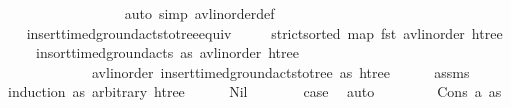 \begin{isabellebody}
\ \ \ \ \ \ \ \ \ \ \ \ \ \ \ \ \isamarkupfalse%
\ {\isacharparenleft}{\kern0pt}auto\ simp{\isacharcolon}{\kern0pt}\ avl{\isacharunderscore}{\kern0pt}inorder{\isacharunderscore}{\kern0pt}def{\isacharparenright}{\kern0pt}\isanewline
\ \ \ \ \ \ \ \ \ \ \ \ \isamarkupfalse%
\isanewline
\ \ \ \ \ \ \ \ \ \ \isamarkupfalse%
\isanewline
\ \ \ \ \ \isamarkupfalse%
\isanewline
\ \ \isamarkupfalse%
%
\endisatagproof
{\isafoldproof}%
%
\isadelimproof
\isanewline
%
\endisadelimproof
\isanewline
\ \ \isamarkupfalse%
\ insert{\isacharunderscore}{\kern0pt}timed{\isacharunderscore}{\kern0pt}ground{\isacharunderscore}{\kern0pt}acts{\isacharunderscore}{\kern0pt}to{\isacharunderscore}{\kern0pt}tree{\isacharunderscore}{\kern0pt}equiv{\isacharcolon}{\kern0pt}\isanewline
\ \ \ \ \ {\isachardoublequoteopen}strict{\isacharunderscore}{\kern0pt}sorted\ {\isacharparenleft}{\kern0pt}map\ fst\ {\isacharparenleft}{\kern0pt}avl{\isacharunderscore}{\kern0pt}inorder\ htree{\isacharparenright}{\kern0pt}{\isacharparenright}{\kern0pt}{\isachardoublequoteclose}\isanewline
\ \ \ \ \ {\isachardoublequoteopen}insort{\isacharunderscore}{\kern0pt}timed{\isacharunderscore}{\kern0pt}ground{\isacharunderscore}{\kern0pt}acts\ as\ {\isacharparenleft}{\kern0pt}avl{\isacharunderscore}{\kern0pt}inorder\ htree{\isacharparenright}{\kern0pt}\ \isanewline
\ \ \ \ \ \ \ \ \ \ \ \ {\isacharequal}{\kern0pt}\ avl{\isacharunderscore}{\kern0pt}inorder\ {\isacharparenleft}{\kern0pt}insert{\isacharunderscore}{\kern0pt}timed{\isacharunderscore}{\kern0pt}ground{\isacharunderscore}{\kern0pt}acts{\isacharunderscore}{\kern0pt}to{\isacharunderscore}{\kern0pt}tree\ as\ htree{\isacharparenright}{\kern0pt}{\isachardoublequoteclose}\isanewline
%
\isadelimproof
\ \ \ \ %
\endisadelimproof
%
\isatagproof
{}\isamarkupfalse%
\ assms\isanewline
\ \ \isamarkupfalse%
\ {\isacharparenleft}{\kern0pt}induction\ as\ arbitrary{\isacharcolon}{\kern0pt}\ htree{\isacharparenright}{\kern0pt}\isanewline
\ \ \ \ \isamarkupfalse%
\ Nil\isanewline
\ \ \ \ \isamarkupfalse%
\ \isamarkupfalse%
\ {\isacharquery}{\kern0pt}case\ \isamarkupfalse%
\ auto\isanewline
\ \ \isamarkupfalse%
\isanewline
\ \ \ \ \isamarkupfalse%
\ {\isacharparenleft}{\kern0pt}Cons\ a{\isacharprime}{\kern0pt}\ as{\isacharparenright}{\kern0pt}\isanewline
\ \ \ \ \isamarkupfalse%

\end{isabellebody}
